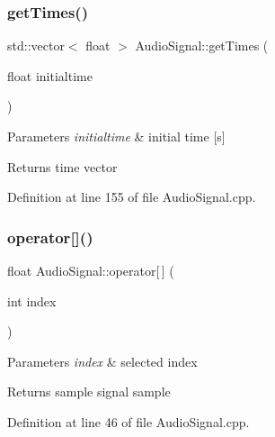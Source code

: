 \subsubsection{\texorpdfstring{get\+Times()}{getTimes()}\hspace{0.1cm}{\footnotesize\ttfamily [2/2]}}
{\footnotesize\ttfamily std\+::vector$<$ float $>$ Audio\+Signal\+::get\+Times (\begin{DoxyParamCaption}\item[{float}]{initialtime }\end{DoxyParamCaption})}


\begin{DoxyParams}{Parameters}
{\em initialtime} & initial time \mbox{[}s\mbox{]} \\
\hline
\end{DoxyParams}
\begin{DoxyReturn}{Returns}
time vector 
\end{DoxyReturn}


Definition at line 155 of file Audio\+Signal.\+cpp.

\mbox{\label{class_audio_signal_a92f6f979d43fe72d965e17b86dd82e79}} 
\subsubsection{\texorpdfstring{operator[]()}{operator[]()}}
{\footnotesize\ttfamily float Audio\+Signal\+::operator\mbox{[}$\,$\mbox{]} (\begin{DoxyParamCaption}\item[{int}]{index }\end{DoxyParamCaption})}


\begin{DoxyParams}{Parameters}
{\em index} & selected index \\
\hline
\end{DoxyParams}
\begin{DoxyReturn}{Returns}
sample signal sample 
\end{DoxyReturn}


Definition at line 46 of file Audio\+Signal.\+cpp.

